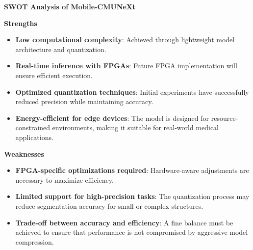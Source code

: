 \begin{tcolorbox}[colframe=black, colback=white, sharp corners, boxrule=1pt, width=\textwidth]
    \begin{center}
        {\Large \textbf{SWOT Analysis of Mobile-CMUNeXt}}
    \end{center}

    \begin{minipage}{0.48\textwidth}
        \textbf{Strengths}
        \begin{itemize}
            \item \textbf{Low computational complexity}: Achieved through lightweight model architecture and quantization.
            \item \textbf{Real-time inference with FPGAs}: Future FPGA implementation will ensure efficient execution.
            \item \textbf{Optimized quantization techniques}: Initial experiments have successfully reduced precision while maintaining accuracy.
            \item \textbf{Energy-efficient for edge devices}: The model is designed for resource-constrained environments, making it suitable for real-world medical applications.
        \end{itemize}
    \end{minipage}
    \hfill
    \begin{minipage}{0.48\textwidth}
        \textbf{Weaknesses}
        \begin{itemize}
            \item \textbf{FPGA-specific optimizations required}: Hardware-aware adjustments are necessary to maximize efficiency.
            \item \textbf{Limited support for high-precision tasks}: The quantization process may reduce segmentation accuracy for small or complex structures.
            \item \textbf{Trade-off between accuracy and efficiency}: A fine balance must be achieved to ensure that performance is not compromised by aggressive model compression.
        \end{itemize}
    \end{minipage}
    \vspace{0.5cm}
    

\end{tcolorbox}
